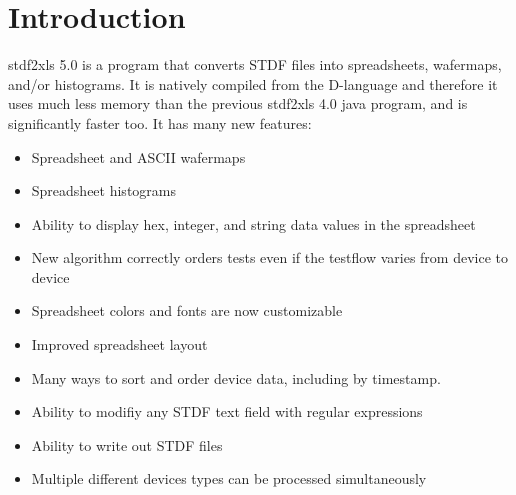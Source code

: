 \documentclass[letterpaper]{article}
\begin{document}
\selectfont
\newcommand{\tfont}{\usefont{T1}{ua1}{m}{n}\selectfont\footnotesize}
\newcommand{\bfont}{\usefont{T1}{ua1}{b}{n}\selectfont\tiny}
\newcommand{\xfont}{\usefont{T1}{ua1}{m}{n}\selectfont\scriptsize}
\newcommand{\lfont}{\usefont{T1}{ua1}{m}{n}\selectfont\large}
\renewcommand{\captionfont}{\it }
\renewcommand{\date}{February 26, 2020}
\newcommand{\ver}{V1.0}
\newcommand{\tablecap}{\hline\end{tabular}\end{table}\end{center}}
\renewcommand{\versionhistory}{
\vspace*{1in}
\begin{center}
\begin{table}[H]\caption*{Revision History}
\centering
\xfont\begin{tabular}[H]{|c|c|c|c|}
\hline
{\bf Version} & {\bf Author} & {\bf Date} & {\bf Changes}\\
\hline
\hline
1.0 & Eric West & 2/26/20 & Initial Release \\
\hline
\end{tabular}
\end{table}
\end{center}
}
\maketitle
\setcounter{tocdepth}{3}
\tableofcontents
\clearpage
\makebg

\section{\bf Introduction}
stdf2xls 5.0 is a program that converts STDF files into spreadsheets, wafermaps, and/or histograms.
It is natively compiled from the D-language and therefore it uses much less memory than the previous
stdf2xls 4.0 java program, and is significantly faster too.  It has many new features:
\begin{itemize}
\item Spreadsheet and ASCII wafermaps
\item Spreadsheet histograms
\item Ability to display hex, integer, and string data values in the spreadsheet
\item New algorithm correctly orders tests even if the testflow varies from device to device
\item Spreadsheet colors and fonts are now customizable
\item Improved spreadsheet layout
\item Many ways to sort and order device data, including by timestamp.
\item Ability to modifiy any STDF text field with regular expressions
\item Ability to write out STDF files
\item Multiple different devices types can be processed simultaneously
\end{itemize}
\end{document}
